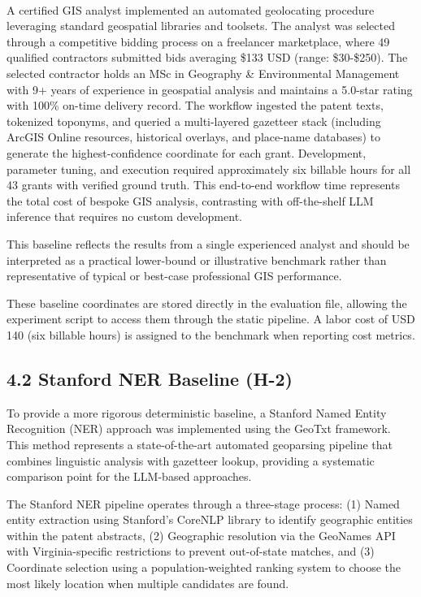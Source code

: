 \documentclass[
  10pt]{article}
\begin{document}
A certified GIS
analyst\textsuperscript{} implemented
an automated geolocating procedure leveraging standard geospatial
libraries and toolsets. The analyst was selected through a competitive
bidding process on a freelancer marketplace, where 49 qualified
contractors submitted bids averaging \$133 USD (range: \$30-\$250). The
selected contractor holds an MSc in Geography \& Environmental
Management with 9+ years of experience in geospatial analysis and
maintains a 5.0-star rating with 100\% on-time delivery record. The
workflow ingested the patent texts, tokenized toponyms, and queried a
multi-layered gazetteer stack (including ArcGIS Online resources,
historical overlays, and place-name databases) to generate the
highest-confidence coordinate for each grant. Development, parameter
tuning, and execution required approximately six billable hours for all
43 grants with verified ground truth. This end-to-end workflow time
represents the total cost of bespoke GIS analysis, contrasting with
off-the-shelf LLM inference that requires no custom development.

This baseline reflects the results from a single experienced analyst and
should be interpreted as a practical lower-bound or illustrative
benchmark rather than representative of typical or best-case
professional GIS performance.

These baseline coordinates are stored directly in the evaluation file,
allowing the experiment script to access them through the static
pipeline. A labor cost of USD 140 (six billable hours) is assigned to
the benchmark when reporting cost metrics.

\subsection{4.2 Stanford NER Baseline
(H-2)}\label{stanford-ner-baseline-h-2}

To provide a more rigorous deterministic baseline, a Stanford Named
Entity Recognition (NER) approach was implemented using the GeoTxt
framework. This method represents a state-of-the-art automated
geoparsing pipeline that combines linguistic analysis with gazetteer
lookup, providing a systematic comparison point for the LLM-based
approaches.

The Stanford NER pipeline operates through a three-stage process: (1)
Named entity extraction using Stanford's CoreNLP library to identify
geographic entities within the patent abstracts, (2) Geographic
resolution via the GeoNames API with Virginia-specific restrictions to
prevent out-of-state matches, and (3) Coordinate selection using a
population-weighted ranking system to choose the most likely location
when multiple candidates are found.
\end{document}
